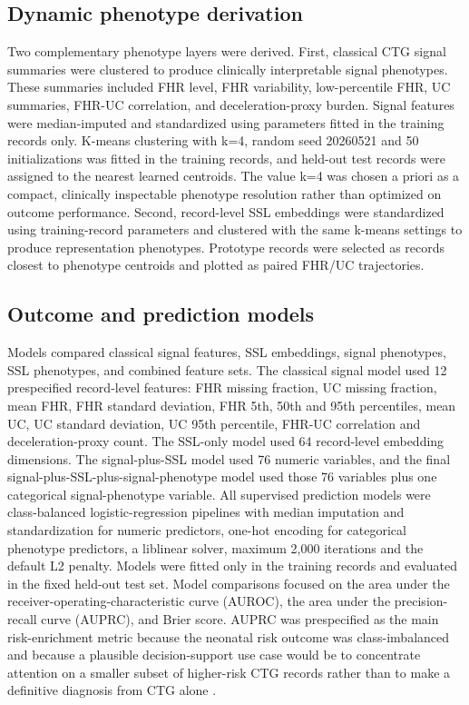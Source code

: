 \documentclass[utf8]{FrontiersinHarvard}
\begin{document}
\subsection{Dynamic phenotype derivation}

Two complementary phenotype layers were derived. First, classical CTG signal summaries were clustered to produce clinically interpretable signal phenotypes. These summaries included FHR level, FHR variability, low-percentile FHR, UC summaries, FHR-UC correlation, and deceleration-proxy burden. Signal features were median-imputed and standardized using parameters fitted in the training records only. K-means clustering with k=4, random seed 20260521 and 50 initializations was fitted in the training records, and held-out test records were assigned to the nearest learned centroids. The value k=4 was chosen a priori as a compact, clinically inspectable phenotype resolution rather than optimized on outcome performance. Second, record-level SSL embeddings were standardized using training-record parameters and clustered with the same k-means settings to produce representation phenotypes. Prototype records were selected as records closest to phenotype centroids and plotted as paired FHR/UC trajectories.

\subsection{Outcome and prediction models}

Models compared classical signal features, SSL embeddings, signal phenotypes, SSL phenotypes, and combined feature sets. The classical signal model used 12 prespecified record-level features: FHR missing fraction, UC missing fraction, mean FHR, FHR standard deviation, FHR 5th, 50th and 95th percentiles, mean UC, UC standard deviation, UC 95th percentile, FHR-UC correlation and deceleration-proxy count. The SSL-only model used 64 record-level embedding dimensions. The signal-plus-SSL model used 76 numeric variables, and the final signal-plus-SSL-plus-signal-phenotype model used those 76 variables plus one categorical signal-phenotype variable. All supervised prediction models were class-balanced logistic-regression pipelines with median imputation and standardization for numeric predictors, one-hot encoding for categorical phenotype predictors, a liblinear solver, maximum 2,000 iterations and the default L2 penalty. Models were fitted only in the training records and evaluated in the fixed held-out test set. Model comparisons focused on the area under the receiver-operating-characteristic curve (AUROC), the area under the precision-recall curve (AUPRC), and Brier score. AUPRC was prespecified as the main risk-enrichment metric because the neonatal risk outcome was class-imbalanced and because a plausible decision-support use case would be to concentrate attention on a smaller subset of higher-risk CTG records rather than to make a definitive diagnosis from CTG alone \citep{davis2006}.
\end{document}
